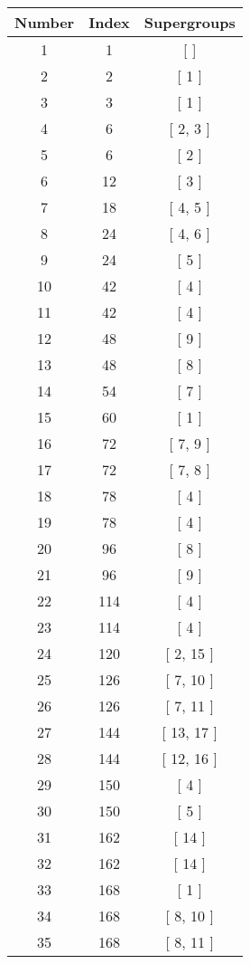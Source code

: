 \begin{center}
\begin{longtable}[H]{|| c c c ||}
\hline
Number & Index & Supergroups \\ 
\hline
1 & 1 & [ ] \\ 
\hline
2 & 2 & [ 1 ] \\ 
\hline
3 & 3 & [ 1 ] \\ 
\hline
4 & 6 & [ 2, 3 ] \\ 
\hline
5 & 6 & [ 2 ] \\ 
\hline
6 & 12 & [ 3 ] \\ 
\hline
7 & 18 & [ 4, 5 ] \\ 
\hline
8 & 24 & [ 4, 6 ] \\ 
\hline
9 & 24 & [ 5 ] \\ 
\hline
10 & 42 & [ 4 ] \\ 
\hline
11 & 42 & [ 4 ] \\ 
\hline
12 & 48 & [ 9 ] \\ 
\hline
13 & 48 & [ 8 ] \\ 
\hline
14 & 54 & [ 7 ] \\ 
\hline
15 & 60 & [ 1 ] \\ 
\hline
16 & 72 & [ 7, 9 ] \\ 
\hline
17 & 72 & [ 7, 8 ] \\ 
\hline
18 & 78 & [ 4 ] \\ 
\hline
19 & 78 & [ 4 ] \\ 
\hline
20 & 96 & [ 8 ] \\ 
\hline
21 & 96 & [ 9 ] \\ 
\hline
22 & 114 & [ 4 ] \\ 
\hline
23 & 114 & [ 4 ] \\ 
\hline
24 & 120 & [ 2, 15 ] \\ 
\hline
25 & 126 & [ 7, 10 ] \\ 
\hline
26 & 126 & [ 7, 11 ] \\ 
\hline
27 & 144 & [ 13, 17 ] \\ 
\hline
28 & 144 & [ 12, 16 ] \\ 
\hline
29 & 150 & [ 4 ] \\ 
\hline
30 & 150 & [ 5 ] \\ 
\hline
31 & 162 & [ 14 ] \\ 
\hline
32 & 162 & [ 14 ] \\ 
\hline
33 & 168 & [ 1 ] \\ 
\hline
34 & 168 & [ 8, 10 ] \\ 
\hline
35 & 168 & [ 8, 11 ] \\ 
\hline

\end{longtable}
\end{center}
